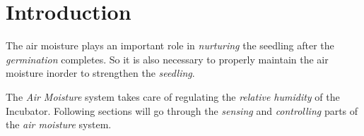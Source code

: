 \documentclass[../../main]{subfiles}
\begin{document}
\section{Introduction} \label{sec:}

The air moisture plays an important role in \emph{nurturing} the seedling after the \emph{germination}
completes. So it is also necessary to properly maintain the air moisture inorder to strengthen the
\emph{seedling}.

The \emph{Air Moisture} system takes care of regulating the \emph{relative humidity} of the Incubator.
Following sections will go through the \emph{sensing} and \emph{controlling} parts of the \emph{air moisture}
system.
\end{document}
